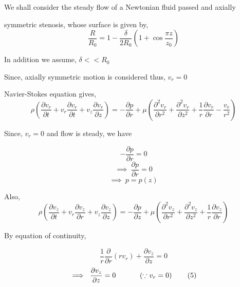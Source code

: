 \documentclass[12pt, a4paper]{article} %
\begin{document}
We shall consider the steady flow of a Newtonian fluid passed and axially 

symmetric stenosis, whose surface is given by,
\begin{equation*}
    \frac{R}{R_0} = 1-\frac{\delta}{2R_0}\left(1 + \cos\frac{\pi z}{z_0}\right)\tag*{(1)}
\end{equation*}

\begin{center}
    \def \svgwidth{15cm}
    
\end{center}

In addition we assume, $\delta << R_0$

Since, axially symmetric motion is considered thus, $v_r = 0$

Navier-Stokes equation gives,
\begin{equation*}
    \rho\left(\frac{\partial v_r}{\partial t} + v_r\frac{\partial v_r}{\partial t} + v_z\frac{\partial v_r}{\partial z}\right) = -\frac{\partial p}{\partial r} + \mu\left(\frac{\partial^2 v_r}{\partial r^2} + \frac{\partial^2 v_r}{\partial z^2}+\frac{1}{r}\frac{\partial v_r}{\partial r} - \frac{v_r}{r^2}\right)
\end{equation*}

Since, $v_r = 0$ and flow is steady, we have

\begin{equation*}
    -\frac{\partial p}{\partial r} = 0 
\end{equation*}
\begin{equation*}
    \implies\ \frac{\partial p}{\partial r} = 0 \tag*{(2)}
\end{equation*}
\begin{equation*}
    \implies\ p = p(z) \tag*{(3)}
\end{equation*}

Also,
\begin{equation*}
    \rho\left(\frac{\partial v_z}{\partial t} + v_r\frac{\partial v_z}{\partial r} + v_z\frac{\partial v_z}{\partial z}\right) = -\frac{\partial p}{\partial z} + \mu\left(\frac{\partial^2 v_z}{\partial r^2} + \frac{\partial^2 v_z}{\partial z^2}+\frac{1}{r}\frac{\partial v_z}{\partial r}\right) \tag*{(4)}
\end{equation*}

By equation of continuity,

\begin{equation*}
    \frac{1}{r}\frac{\partial}{\partial r}\left(rv_r\right) + \frac{\partial v_z}{\partial z} = 0
\end{equation*}
\begin{equation*}
    \implies\ \frac{\partial v_z}{\partial z} = 0\hspace*{1cm}\ \left(\because v_r = 0\right)\tag*{(5)}
\end{equation*}
\end{document}
